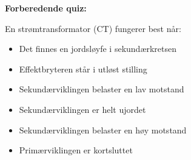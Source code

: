 \vfil \eject

\noindent
{\bf Forberedende quiz:}

En strømtransformator (CT) fungerer best når:

\begin{itemize}
\item{} Det finnes en jordsløyfe i sekundærkretsen
\vskip 5pt 
\item{} Effektbryteren står i utløst stilling
\vskip 5pt 
\item{} Sekundærviklingen belaster en lav motstand
\vskip 5pt 
\item{} Sekundærviklingen er helt ujordet
\vskip 5pt 
\item{} Sekundærviklingen belaster en høy motstand
\vskip 5pt 
\item{} Primærviklingen er kortsluttet
\end{itemize}


